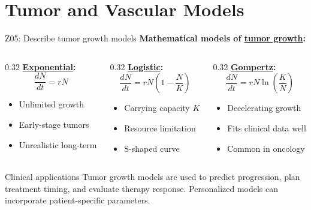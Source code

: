 \documentclass[aspectratio=169, 10pt]{beamer}
\begin{document}
\section{Tumor and Vascular Models}

\begin{frame}{Z05: Describe tumor growth models}
    \textbf{Mathematical models of \href{https://en.wikipedia.org/wiki/Tumor_growth}{tumor growth}:}
    
    \vspace{0.2cm}
    \begin{columns}[T]
        \begin{column}{0.32\textwidth}
            \textbf{\href{https://en.wikipedia.org/wiki/Exponential_growth}{Exponential}:}
            \[
            \frac{dN}{dt} = rN
            \]
            \begin{itemize}
                \item Unlimited growth
                \item Early-stage tumors
                \item Unrealistic long-term
            \end{itemize}
        \end{column}
        \begin{column}{0.32\textwidth}
            \textbf{\href{https://en.wikipedia.org/wiki/Logistic_function}{Logistic}:}
            \[
            \frac{dN}{dt} = rN\left(1 - \frac{N}{K}\right)
            \]
            \begin{itemize}
                \item Carrying capacity $K$
                \item Resource limitation
                \item S-shaped curve
            \end{itemize}
        \end{column}
        \begin{column}{0.32\textwidth}
            \textbf{\href{https://en.wikipedia.org/wiki/Gompertz_function}{Gompertz}:}
            \[
            \frac{dN}{dt} = rN \ln\left(\frac{K}{N}\right)
            \]
            \begin{itemize}
                \item Decelerating growth
                \item Fits clinical data well
                \item Common in oncology
            \end{itemize}
        \end{column}
    \end{columns}
    
    \vspace{0.3cm}
    \begin{block}{Clinical applications}
        Tumor growth models are used to predict progression, plan treatment timing, and evaluate therapy response. Personalized models can incorporate patient-specific parameters.
    \end{block}
\end{frame}
\end{document}
